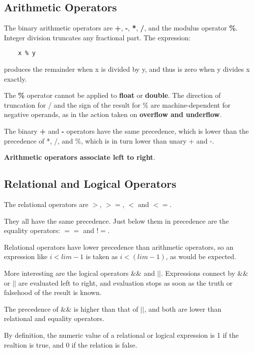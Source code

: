 \documentclass{article}
\begin{document}
\subsection{Arithmetic Operators}

The binary arithmetic operators are \textbf{+}, \textbf{-}, \textbf{*}, \textbf{/}, and the modulus operator \textbf{\%}. Integer division truncates any fractional part. The expression:

\begin{lstlisting}
	x % y
\end{lstlisting}

produces the remainder when x is divided by y, and thus is zero when y divides x exactly.

The \textbf{\%} operator cannot be applied to \textbf{float} or \textbf{double}. The direction of truncation for / and the sign of the result for \% are machine-dependent for negative operands, as in the action taken on \textbf{overflow and underflow}.

The binary \textbf{+} and \textbf{-} operators have the same precedence, which is lower than the precedence of *, /, and \%, which is in turn lower than unary + and -.

\textbf{Arithmetic operators associate left to right}.

\clearpage
\subsection{Relational and Logical Operators}

The relational operators are \textbf{$>$}, \textbf{$>=$}, \textbf{$<$} and \textbf{$<=$}.

They all have the same precedence. Just below them in precedence are the equality operators: \textbf{$==$} and \textbf{$!=$}.

Relational operators have lower precedence than arithmetic operators, so an expression like \textbf{$i < lim-1$} is taken as \textbf{$i < (lim-1)$}, as would be expected.

More interesting are the logical operators \textbf{$\&\&$} and \textbf{$||$}. Expressions connect by $\&\&$ or $||$ are evaluated left to right, and evaluation stops as soon as the truth or falsehood of the result is known. 

The precedence of $\&\&$ is higher than that of $||$, and both are lower than relational and equality operators.

By definition, the numeric value of a relational or logical expression is 1 if the realtion is true, and 0 if the relation is false. 
\end{document}
